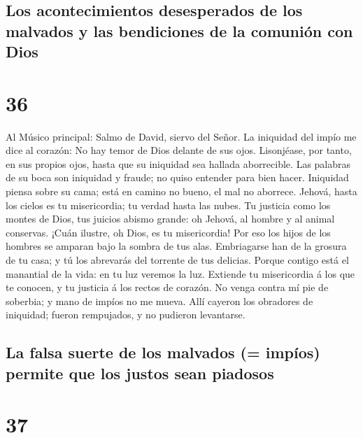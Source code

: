 \hypertarget{los-acontecimientos-desesperados-de-los-malvados-y-las-bendiciones-de-la-comuniuxf3n-con-dios}{%
\subsection{Los acontecimientos desesperados de los malvados y las
bendiciones de la comunión con
Dios}\label{los-acontecimientos-desesperados-de-los-malvados-y-las-bendiciones-de-la-comuniuxf3n-con-dios}}

\hypertarget{section-35}{%
\section{36}\label{section-35}}

 Al Músico principal: Salmo de David, siervo del Señor. La
iniquidad del impío me dice al corazón: No hay temor de Dios delante de
sus ojos.  Lisonjéase, por tanto, en sus propios ojos,
hasta que su iniquidad sea hallada aborrecible.  Las
palabras de su boca son iniquidad y fraude; no quiso entender para bien
hacer.  Iniquidad piensa sobre su cama; está en camino no
bueno, el mal no aborrece.  Jehová, hasta los cielos es tu
misericordia; tu verdad hasta las nubes.  Tu justicia como
los montes de Dios, tus juicios abismo grande: oh Jehová, al hombre y al
animal conservas.  ¡Cuán ilustre, oh Dios, es tu
misericordia! Por eso los hijos de los hombres se amparan bajo la sombra
de tus alas.  Embriagarse han de la grosura de tu casa; y
tú los abrevarás del torrente de tus delicias.  Porque
contigo está el manantial de la vida: en tu luz veremos la luz.
 Extiende tu misericordia á los que te conocen, y tu
justicia á los rectos de corazón.  No venga contra mí pie
de soberbia; y mano de impíos no me mueva.  Allí cayeron
los obradores de iniquidad; fueron rempujados, y no pudieron levantarse.

\hypertarget{la-falsa-suerte-de-los-malvados-impuxedos-permite-que-los-justos-sean-piadosos}{%
\subsection{La falsa suerte de los malvados (= impíos) permite que los
justos sean
piadosos}\label{la-falsa-suerte-de-los-malvados-impuxedos-permite-que-los-justos-sean-piadosos}}

\hypertarget{section-36}{%
\section{37}\label{section-36}}

